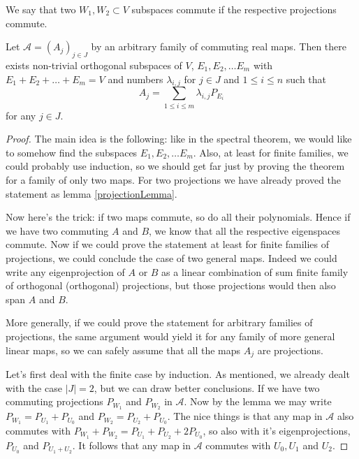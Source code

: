 \begin{maar}
	We say that two $W_{1}, W_{2} \subset V$ subspaces commute if the respective projections commute.
\end{maar}

\begin{lause}\label{commuting_real_maps}
	Let $\mathcal{A} = (A_{j})_{j \in J}$ by an arbitrary family of commuting real maps. Then there exists non-trivial orthogonal subspaces of $V$, $E_{1}, E_{2}, \ldots E_{m}$ with $E_{1} + E_{2} + \ldots + E_{m} = V$ and numbers $\lambda_{i, j}$ for $j \in J$ and $1 \leq i \leq n$ such that
	\[
		A_{j} = \sum_{1 \leq i \leq m} \lambda_{i, j} P_{E_{i}}
	\]
	for any $j \in J$.
\end{lause}
\begin{proof}
	The main idea is the following: like in the spectral theorem, we would like to somehow find the subspaces $E_{1}, E_{2}, \ldots E_{m}$. Also, at least for finite families, we could probably use induction, so we should get far just by proving the theorem for a family of only two maps. For two projections we have already proved the statement as lemma \ref{projectionLemma}.

	Now here's the trick: if two maps commute, so do all their polynomials. Hence if we have two commuting $A$ and $B$, we know that all the respective eigenspaces commute. Now if we could prove the statement at least for finite families of projections, we could conclude the case of two general maps. Indeed we could write any eigenprojection of $A$ or $B$ as a linear combination of sum finite family of orthogonal (orthogonal) projections, but those projections would then also span $A$ and $B$.

	More generally, if we could prove the statement for arbitrary families of projections, the same argument would yield it for any family of more general linear maps, so we can safely assume that all the maps $A_{j}$ are projections.

	Let's first deal with the finite case by induction. As mentioned, we already dealt with the case $|J| = 2$, but we can draw better conclusions. If we have two commuting projections $P_{W_{1}}$ and $P_{W_{2}}$ in $\mathcal{A}$. Now by the lemma we may write $P_{W_{1}} = P_{U_{1}} + P_{U_{0}}$ and $P_{W_{2}} = P_{U_{2}} + P_{U_{0}}$. The nice things is that any map in $\mathcal{A}$ also commutes with $P_{W_{1}} + P_{W_{2}} = P_{U_{1}} + P_{U_{2}} + 2 P_{U_{0}}$, so also with it's eigenprojections, $P_{U_{0}}$ and $P_{U_{1} + U_{2}}$. It follows that any map in $\mathcal{A}$ commutes with $U_{0}, U_{1}$ and $U_{2}$.


\end{proof}
